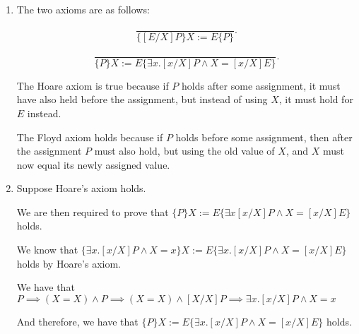 \begin{enumerate}[label=(\alph*)]
\begin{enumerate}[label=(\roman*)]
              \item
                The two axioms are as follows:

                \[
                  \frac{}{\{[E / X]P\}X := E\{P\}}
                .\] 

                \[
                  \frac{}{\{P\}X:= E\{\exists x. [x / X]P \wedge X = [x / X]E\}}
                .\] 

                The Hoare axiom is true because if $P$ holds after some assignment, it must have also held before the assignment, but instead of using $X$, it must hold for $E$ instead.

                The Floyd axiom holds because if $P$ holds before some assignment, then after the assignment $P$ must also hold, but using the old value of $X$, and $X$ must now equal its newly assigned value.

                \item
                  Suppose Hoare's axiom holds.

                  We are then required to prove that $\{P\}X:=E\{\exists x[x / X]P \wedge X = [x / X]E\}$ holds.

                  We know that $\{\exists x.[x / X]P \wedge X = x\}X :=E\{\exists x.[x / X]P \wedge X = [x / X]E\}$ holds by Hoare's axiom.


                We have that $P \implies (X = X) \wedge P \implies (X = X) \wedge [X / X]P \implies \exists x. [x / X]P \wedge X = x$

                And therefore, we have that $\{P\}X:=E \{\exists x.[x / X]P \wedge X = [x / X]E\}$ holds.

        
    \end{enumerate}
        
    \end{enumerate}

